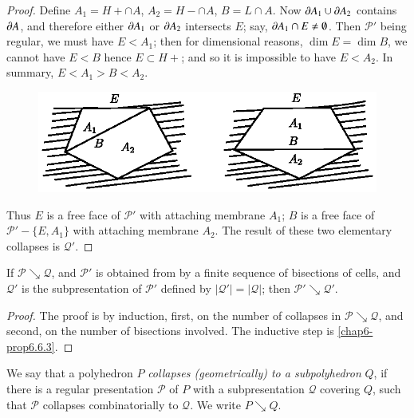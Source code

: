 \begin{proof}
Define $A_{1}=H+\cap A$, $A_{2}=H-\cap A$, $B=L\cap A$. Now $\partial A_{1}\cup \partial A_{2}$ contains $\partial A$, and therefore either $\partial A_{1}$ or $\partial A_{2}$ intersects $E$; say, $\partial A_{1}\cap E\neq \emptyset$. Then $\mathscr{P}'$ being regular, we must have $E<A_{1}$; then for dimensional reasons, $\dim E=\dim B$, we cannot have $E<B$ hence $E\subset H+$; and so it is impossible to have $E<A_{2}$. In summary, $E<A_{1}>B<A_{2}$.
\begin{figure}[H]
\centering
\includegraphics{figure/fig16.eps}
\end{figure}

Thus $E$ is a free face of $\mathscr{P}'$ with attaching membrane $A_{1}$; $B$ is a free face of $\mathscr{P}'-\{E,A_{1}\}$ with attaching membrane $A_{2}$. The result of these two elementary collapses is $\mathcal{Q}'$.
\end{proof}

\begin{proposition}\label{chap6-prop6.6.4}
If $\mathscr{P}\searrow \mathcal{Q}$, and $\mathscr{P}'$ is obtained from by a finite sequence of bisections of cells, and $\mathcal{Q}'$ is the subpresentation of $\mathscr{P}'$ defined by $|\mathcal{Q}'|=|\mathcal{Q}|$; then $\mathscr{P}'\searrow \mathcal{Q}'$. 
\end{proposition}

\begin{proof}
The proof is by induction, first, on the number of collapses in $\mathscr{P}\searrow \mathcal{Q}$, and second, on the number of bisections involved. The inductive step is \ref{chap6-prop6.6.3}.
\end{proof}

\begin{definition}\label{chap6-defi6.6.5}
We say that a polyhedron $P$ {\em collapses (geometrically) to a subpolyhedron} $Q$, if there is a regular presentation $\mathscr{P}$ of $P$ with a subpresentation $\mathcal{Q}$ covering $Q$, such that $\mathscr{P}$ collapses combinatorially to $\mathcal{Q}$. We write $P\searrow Q$.
\end{definition}

